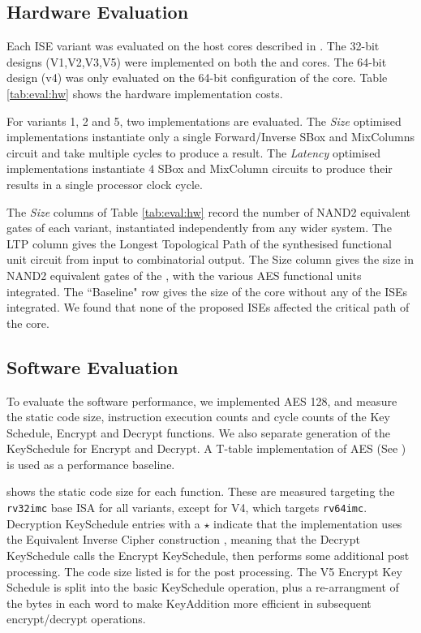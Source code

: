 
\subsection{Hardware Evaluation}
\label{sec:eval:sw}

Each ISE variant was evaluated on the host cores
described in .
The 32-bit designs (V1,V2,V3,V5) were implemented on both the
 and  cores.
The 64-bit design (v4) was only evaluated on the 64-bit configuration
of the  core.
Table \ref{tab:eval:hw} shows the hardware implementation costs.

For variants 1, 2 and 5, two implementations are evaluated.
The {\em Size} optimised implementations instantiate only a single
Forward/Inverse SBox and MixColumns circuit and take multiple cycles
to produce a result.
The {\em Latency} optimised implementations instantiate $4$ SBox and
MixColumn circuits to produce their results in a single processor 
clock cycle.

The {\em Size} columns of Table \ref{tab:eval:hw} 
record the number of NAND2 equivalent gates of each variant,
instantiated independently from any wider system.
The LTP column gives the Longest Topological Path of the synthesised
functional unit circuit from input to combinatorial output.
The  Size column gives the size in NAND2 equivalent gates of the
, with the various AES functional units integrated.
The ``Baseline" row gives the size of the core without any of the
ISEs integrated.
We found that none of the proposed ISEs affected the critical
path of the  core.



\subsection{Software Evaluation}
\label{sec:eval:sw}

To evaluate the software performance, we implemented AES 128, and
measure the static code size, instruction execution counts and cycle
counts of the Key Schedule, Encrypt and Decrypt functions.
We also separate generation of the KeySchedule for Encrypt and Decrypt.
A T-table implementation of AES (See )
is used as a performance baseline.

 shows the static code size for each
function.
These are measured targeting the {\tt rv32imc} base ISA for all variants,
except for V4, which targets {\tt rv64imc}.
Decryption KeySchedule entries with a $\star$ indicate that the
implementation uses the Equivalent Inverse Cipher construction
\cite[Section 5.3.5, Page 23]{FIPS:197}, meaning that the
Decrypt KeySchedule calls the Encrypt KeySchedule, then performs some
additional post processing. The code size listed is for the post processing.
The V5 Encrypt Key Schedule is split into the basic KeySchedule
operation, plus a re-arrangment of the bytes in each word to make
KeyAddition more efficient in subsequent encrypt/decrypt operations.


